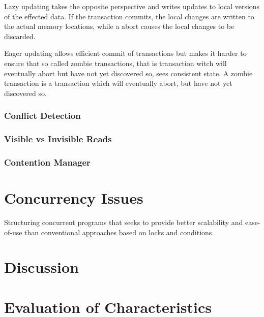 Lazy updating takes the opposite perspective and writes updates to local versions of the effected data\cite[p. 2084]{herlihy2011tm}. If the transaction commits, the local changes are written to the actual memory locations, while a abort causes the local changes to be discarded.

Eager updating allows efficient commit of transactions but makes it harder to ensure that so called zombie transactions, that is transaction witch will eventually abort but have not yet discovered so, sees consistent state\cite[p. 2084]{herlihy2011tm}. A zombie transaction is a transaction which will eventually abort, but have not yet discovered so.
\subsubsection{Conflict Detection}
\subsubsection{Visible vs Invisible Reads}
\subsubsection{Contention Manager}


\section{Concurrency Issues}
\label{sec:stm_issues}
Structuring concurrent programs that seeks to provide better scalability and ease-of-use than conventional approaches based on locks and conditions.

\section{Discussion}
\label{sec:stm_discussion}


\section{Evaluation of Characteristics}
\label{sec:stm_eval}

\worksheetend